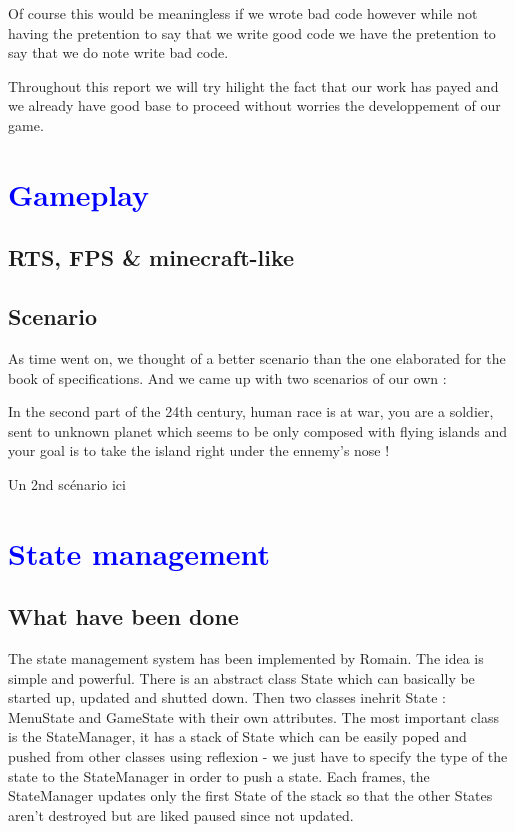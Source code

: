 \documentclass[article]{report} %
\begin{document}
 			Of course this would be meaningless if we wrote bad code however while not having the pretention to say that we write good code we have the pretention to say that 
 			we do note write bad code.

 			Throughout this report we will try hilight the fact that our work has payed and we already have good base to proceed without worries the developpement of our game.



								
  		\chapter{\textcolor{blue}{Gameplay}}
			\section{RTS, FPS \& minecraft-like}

			\section{Scenario}
				As time went on, we thought of a better scenario than the one elaborated for the book of specifications. 
				And we came up with two scenarios of our own : 

				\begin{description}
					\item In the second part of the 24th century, human race is at war, you are a soldier, sent to unknown planet which seems to be only composed
						with flying islands and your goal is to take the island right under the ennemy's nose !
					\item Un 2nd scénario ici
				\end{description} 
				
											
  		\chapter{\textcolor{blue}{State management}}
  			\section{What have been done}
  				The state management system has been implemented by Romain. The idea is simple and powerful. There is an abstract class State which can basically be started up, updated and shutted down. Then two classes inehrit State : MenuState and GameState with their own attributes. The most important class is the StateManager, it has a stack of State which can be easily poped and pushed from other classes using reflexion - we just have to specify the type of the state to the StateManager in order to push a state. Each frames, the StateManager updates only the first State of the stack so that the other States aren't destroyed but are liked paused since not updated.\\
\end{document}
